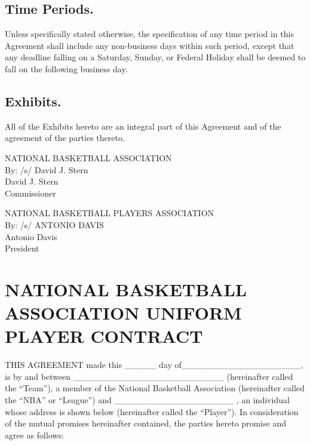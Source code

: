 \documentclass[
]{book}
\begin{document}
\hypertarget{time-periods.}{%
\section{Time Periods.}\label{time-periods.}}

Unless specifically stated otherwise, the specification of any time period in this Agreement shall include any non-business days within such period, except that any deadline falling on a Saturday, Sunday, or Federal Holiday shall be deemed to fall on the following business day.

\hypertarget{exhibits.}{%
\section{Exhibits.}\label{exhibits.}}

All of the Exhibits hereto are an integral part of this Agreement and of the agreement of the parties thereto.

NATIONAL BASKETBALL ASSOCIATION\\
By: /s/ David J. Stern\\
David J. Stern\\
Commissioner

NATIONAL BASKETBALL PLAYERS ASSOCIATION\\
By: /s/ ANTONIO DAVIS\\
Antonio Davis\\
President

\hypertarget{appendix-appendix}{%
\appendix}


\hypertarget{national-basketball-association-uniform-player-contract}{%
\chapter{NATIONAL BASKETBALL ASSOCIATION UNIFORM PLAYER CONTRACT}\label{national-basketball-association-uniform-player-contract}}

THIS AGREEMENT made this \_\_\_\_\_ day of\_\_\_\_\_\_\_\_\_\_\_\_\_\_\_\_\_\_\_, is by and between \_\_\_\_\_\_\_\_\_\_\_\_\_\_\_\_\_\_\_\_\_\_\_\_ (hereinafter called the ``Team''), a member of the National Basketball Association (hereinafter called the ``NBA'' or ``League'') and \_\_\_\_\_\_\_\_\_\_\_\_\_\_\_\_\_\_\_ , an individual whose address is shown below (hereinafter called the ``Player''). In consideration of the mutual promises hereinafter contained, the parties hereto promise and agree as follows:
\end{document}
